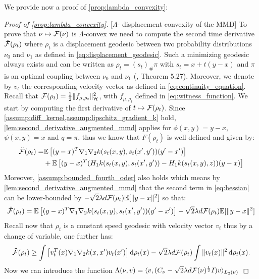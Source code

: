 We provide now a proof of \cref{prop:lambda_convexity}:
\begin{proof}[Proof of \cref{prop:lambda_convexity}]\label{proof:prop:lambda_convexity}[$\Lambda$- displacement convexity of the MMD]
To prove that $\nu\mapsto {{\mathcal F}}(\nu)$ is $\Lambda$-convex
we need to compute the second time derivative $\ddot{{{\mathcal F}}}(\rho_{t})$
where $\rho_{t}$ is a displacement geodesic between two probability
distributions $\nu_{0}$ and $\nu_{1}$ as defined in \cref{eq:displacement_geodesic}. Such a minimizing geodesic always exists and can be written as $\rho_t = (s_t)_{\#}\pi$ with $s_t = x + t(y-x)$ and $\pi$ is an optimal coupling between $\nu_0$ and $\nu_1$ (\cite{Santambrogio:2015}, Theorem 5.27). Moreover, we denote by $v_t$ the corresponding velocity vector as defined in \cref{eq:continuity_equation}. Recall that ${{\mathcal F}}(\rho_t) = \frac{1}{2} \Vert f_{\mu,\rho_t}\Vert^2_{\mathcal{H}}$, with $f_{\mu,\rho_t}$ defined in \cref{eq:witness_function}. %
We start by computing the first derivative of $ t\mapsto {{\mathcal F}}(\rho_t) $. Since \cref{assump:diff_kernel,assump:lipschitz_gradient_k} hold, \cref{lem:second_derivative_augmented_mmd} applies for $\phi(x,y) = y-x$, $\psi(x,y) = x$ and $q = \pi$, thus we know that $\ddot{F}(\rho_t)$ is well defined and given by:
\begin{align}\label{eq:hessian}
\begin{split}
	\ddot{{{\mathcal F}}}(\rho_t) =&\mathbb{E}\left[ (y-x)^T\nabla_1 \nabla_2 k(s_t(x,y),s_t(x',y'))(y'-x')\right]\\
&+ \mathbb{E}\left[ (y-x)^T( H_1 k(s_t(x,y),s_t(x',y'))-H_1 k(s_t(x,y),z))(y-x)\right]
\end{split}
\end{align}
Moreover, \cref{assump:bounded_fourth_oder} also holds which means by \cref{lem:second_derivative_augmented_mmd} that the second term in \cref{eq:hessian} can be lower-bounded by $-\sqrt{2}\lambda d{{\mathcal F}}(\rho_t)\mathbb{E}[ \Vert y-x \Vert^2]$ so that:
\[
\ddot{{{\mathcal F}}}(\rho_t) =\mathbb{E}\left[ (y-x)^T\nabla_1 \nabla_2 k(s_t(x,y),s_t(x',y'))(y'-x')\right] - \sqrt{2}\lambda d{{\mathcal F}}(\rho_t) \mathbb{E}[ \Vert y-x \Vert^2]
\]
Recall now that $\rho_t$ is a constant speed geodesic with velocity vector $v_t$ thus by a change of variable, one further has:
\[
\ddot{{{\mathcal F}}}(\rho_t) \geq\int\left[ v_t^T(x)\nabla_1 \nabla_2 k(x,x')v_t(x')\right]\mathop{}\!\mathrm{d} \rho_t(x) - \sqrt{2}\lambda d{{\mathcal F}}(\rho_t) \int \Vert v_t(x) \Vert^2 \mathop{}\!\mathrm{d} \rho_t(x).
\]
Now we can introduce the function $\Lambda(\nu,v) = \langle v ,( C_{\nu} -\sqrt{2}\lambda d {{\mathcal F}}(\nu)^{\frac{1}{2}} I) v \rangle_{L_2(\nu)}$

\end{proof}

